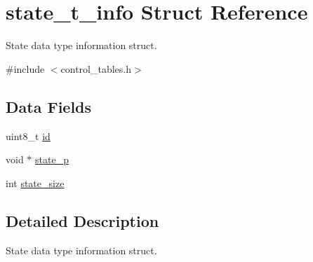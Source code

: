\hypertarget{structstate__t__info}{
\section{state\-\_\-t\-\_\-info \-Struct \-Reference}
\label{structstate__t__info}
}


\-State data type information struct.  




{\ttfamily \#include $<$control\-\_\-tables.\-h$>$}

\subsection*{\-Data \-Fields}
\begin{DoxyCompactItemize}
\item 
uint8\-\_\-t \hyperlink{structstate__t__info_ae955a81f5474b2457a6aa82ea183eab8}{id}
\item 
void $\ast$ \hyperlink{structstate__t__info_abf22bd945b57e8c3317a73c618f13aca}{state\-\_\-p}
\item 
int \hyperlink{structstate__t__info_a8831bb5e2e85d6aa8906e984c60c354e}{state\-\_\-size}
\end{DoxyCompactItemize}


\subsection{\-Detailed \-Description}
\-State data type information struct. 

